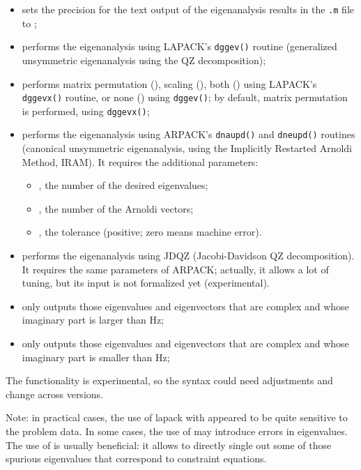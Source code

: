 \begin{itemize}
        ;
\item {} sets the precision for the text output
  	of the eigenanalysis results in the \texttt{.m} file to
	;
\item {} performs the eigenanalysis using
	LAPACK's \texttt{dggev()} routine (generalized unsymmetric eigenanalysis
	using the QZ decomposition);
\item {} performs matrix permutation (),
	scaling (), both () using LAPACK's
	\texttt{dggevx()} routine, or none () using \texttt{dggev()};
	by default, matrix permutation is performed, using \texttt{dggevx()};
\item {} performs the eigenanalysis using
	ARPACK's \texttt{dnaupd()} and \texttt{dneupd()} routines
	(canonical unsymmetric eigenanalysis,
	using the Implicitly Restarted Arnoldi Method, IRAM).
	It requires the additional parameters:
	\begin{itemize}
	\item {}, the number of the desired eigenvalues;
	\item {}, the number of the Arnoldi vectors;
	\item {}, the tolerance (positive; zero means machine error).
	\end{itemize}
\item {} performs the eigenanalysis using JDQZ (Jacobi-Davidson QZ
	decomposition).
	It requires the same parameters of ARPACK;
	actually, it allows a lot of tuning, but its input
	is not formalized yet (experimental).
\item {} only outputs those eigenvalues and eigenvectors
	that are complex and whose imaginary part is larger than
	 Hz;
\item {} only outputs those eigenvalues and eigenvectors
	that are complex and whose imaginary part is smaller than
	 Hz;
\end{itemize}
The  functionality is experimental,
so the syntax could need adjustments and change across versions.

Note: in practical cases, the use of lapack with 
appeared to be quite sensitive to the problem data.
In some cases, the use of  may introduce errors
in eigenvalues.
The use of  is usually beneficial: it allows to directly
single out some of those spurious eigenvalues that correspond
to constraint equations.

